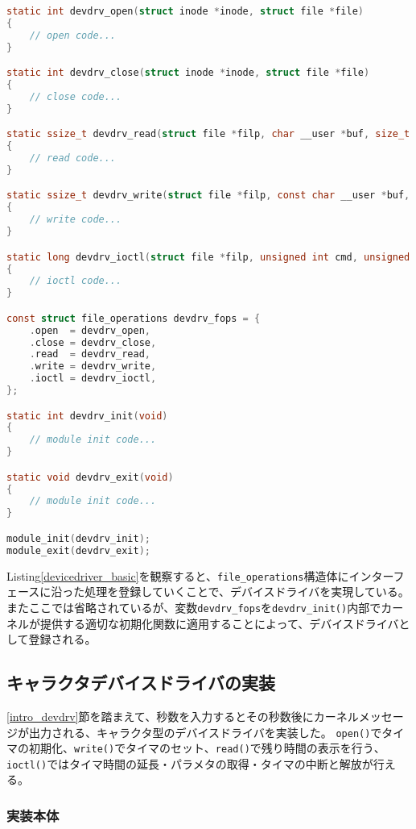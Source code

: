 \documentclass[main]{subfiles}
\begin{document}
\begin{lstlisting}[label=devicedriver_basic,caption=デバイスドライバの骨組み,language=c]
static int devdrv_open(struct inode *inode, struct file *file)
{
    // open code...
}

static int devdrv_close(struct inode *inode, struct file *file)
{
    // close code...
}

static ssize_t devdrv_read(struct file *filp, char __user *buf, size_t count, loff_t *offset)
{
    // read code...
}

static ssize_t devdrv_write(struct file *filp, const char __user *buf, size_t count, loff_t *offset)
{
    // write code...
}

static long devdrv_ioctl(struct file *filp, unsigned int cmd, unsigned long arg)
{
    // ioctl code...
}

const struct file_operations devdrv_fops = {
    .open  = devdrv_open,
    .close = devdrv_close,
    .read  = devdrv_read,
    .write = devdrv_write,
    .ioctl = devdrv_ioctl,
};

static int devdrv_init(void)
{
    // module init code...
}

static void devdrv_exit(void)
{
    // module init code...
}

module_init(devdrv_init);
module_exit(devdrv_exit);
\end{lstlisting}

Listing\ref{devicedriver_basic}を観察すると、\texttt{file\_operations}構造体にインターフェースに沿った処理を登録していくことで、デバイスドライバを実現している。
またここでは省略されているが、変数\texttt{devdrv\_fops}を\texttt{devdrv\_init()}内部でカーネルが提供する適切な初期化関数に適用することによって、デバイスドライバとして登録される。

\subsection{キャラクタデバイスドライバの実装}

\ref{intro_devdrv}節を踏まえて、秒数を入力するとその秒数後にカーネルメッセージが出力される、キャラクタ型のデバイスドライバを実装した。
\texttt{open()}でタイマの初期化、\texttt{write()}でタイマのセット、\texttt{read()}で残り時間の表示を行う、\texttt{ioctl()}ではタイマ時間の延長・パラメタの取得・タイマの中断と解放が行える。

\subsubsection{実装本体}
\end{document}
